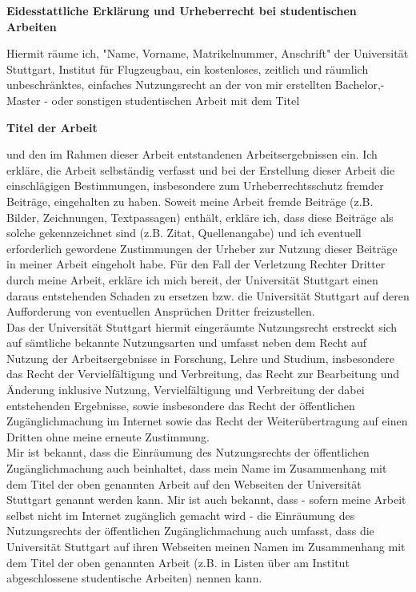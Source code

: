 \begin{large}
	\textbf{Eidesstattliche Erklärung und Urheberrecht bei studentischen Arbeiten\\}
\end{large}

Hiermit räume ich, "Name, Vorname, Matrikelnummer, Anschrift" der Universität Stuttgart, Institut für Flugzeugbau, ein kostenloses, zeitlich und räumlich unbeschränktes, einfaches Nutzungsrecht an der von mir erstellten Bachelor,- Master - oder sonstigen studentischen Arbeit mit dem Titel
\begin{center}
	\textbf{Titel der Arbeit}
\end{center}
und den im Rahmen dieser Arbeit entstandenen Arbeitsergebnissen ein. Ich erkläre, die Arbeit selbständig verfasst und bei der Erstellung dieser Arbeit die einschlägigen Bestimmungen, insbesondere zum Urheberrechtsschutz fremder Beiträge, eingehalten zu haben. Soweit meine Arbeit fremde Beiträge (z.B. Bilder, Zeichnungen, Textpassagen) enthält, erkläre ich, dass diese Beiträge als solche gekennzeichnet sind (z.B. Zitat, Quellenangabe) und ich eventuell erforderlich gewordene Zustimmungen der Urheber zur Nutzung dieser Beiträge in meiner Arbeit eingeholt habe. Für den Fall der Verletzung Rechter Dritter durch meine Arbeit, erkläre ich mich bereit, der Universität Stuttgart einen daraus entstehenden Schaden zu ersetzen bzw. die Universität Stuttgart auf deren Aufforderung von eventuellen Ansprüchen Dritter freizustellen.\\
Das der Universität Stuttgart hiermit eingeräumte Nutzungsrecht erstreckt sich auf sämtliche bekannte Nutzungsarten und umfasst neben dem Recht auf Nutzung der Arbeitsergebnisse in Forschung, Lehre und Studium, insbesondere das Recht der Vervielfältigung und Verbreitung, das Recht zur Bearbeitung und Änderung inklusive Nutzung, Vervielfältigung und Verbreitung der dabei entstehenden Ergebnisse, sowie insbesondere das Recht der öffentlichen Zugänglichmachung im Internet sowie das Recht der Weiterübertragung auf einen Dritten ohne meine erneute Zustimmung.\\
Mir ist bekannt, dass die Einräumung des Nutzungsrechts der öffentlichen Zugänglichmachung auch beinhaltet, dass mein Name im Zusammenhang mit dem Titel der oben genannten Arbeit auf den Webseiten der Universität Stuttgart genannt werden kann. Mir ist auch bekannt, dass - sofern meine Arbeit selbst nicht im Internet zugänglich gemacht wird - die Einräumung des Nutzungsrechts der öffentlichen Zugänglichmachung auch umfasst, dass die Universität Stuttgart auf ihren Webseiten meinen Namen im Zusammenhang mit dem Titel der oben genannten Arbeit (z.B. in Listen über am Institut abgeschlossene studentische Arbeiten) nennen kann.\\
